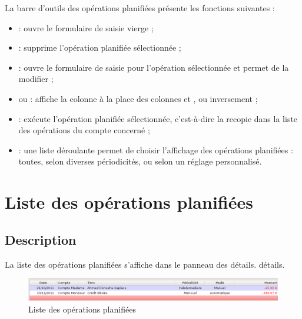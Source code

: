 La barre d'outils des opérations planifiées présente les fonctions suivantes : 

\begin{itemize}
	 \item {} : ouvre le formulaire de saisie vierge ;
	 \item {} : supprime l'opération planifiée sélectionnée ;
	 \item {} : ouvre le formulaire de saisie pour l'opération sélectionnée et permet de la modifier ;
	 \item {} ou  : affiche la colonne  à la place des colonnes  et , ou inversement ; 
	 \item {} : exécute l'opération planifiée sélectionnée, c'est-à-dire la recopie dans la liste des opérations du compte concerné ;
	 \item {} : une liste déroulante permet de choisir l'affichage des opérations planifiées : toutes, selon diverses périodicités, ou selon un réglage personnalisé.
\end{itemize}



\ifIllustration
\newpage
\fi


\section{Liste des opérations planifiées\label{plannedtransactions-list}}


\subsection{Description\label{plannedtransactions-list-description}}

La liste des opérations planifiées s'affiche dans le panneau des
\ifIllustration détails.
\else détails.
\fi

\ifIllustration
\begin{figure}[htbp]
\begin{center}
\includegraphics[scale=0.5]{image/screenshot/planned_transactions_list}
\end{center}
\caption{Liste des opérations planifiées}
\label{planned-transactions-list-img}
\end{figure}
\fi

